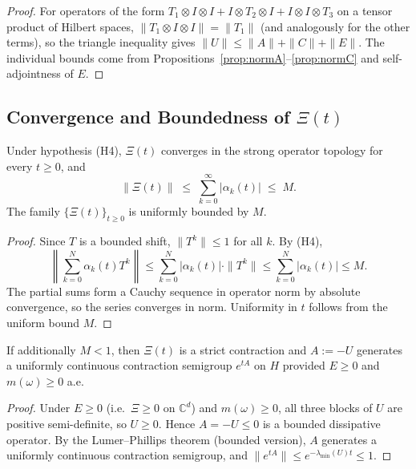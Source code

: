 \documentclass[11pt]{article}
\begin{document}
\begin{proof}
For operators of the form
$T_{1}\otimes I\otimes I + I\otimes T_{2}\otimes I + I\otimes I\otimes T_{3}$
on a tensor product of Hilbert spaces,
$\|T_{1}\otimes I\otimes I\|=\|T_{1}\|$ (and analogously for the other terms),
so the triangle inequality gives
$\|U\|\leq\|A\|+\|C\|+\|E\|$.
The individual bounds come from
Propositions~\ref{prop:normA}--\ref{prop:normC}
and self-adjointness of $E$.
\end{proof}

\subsection{Convergence and Boundedness of \texorpdfstring{$\Xi(t)$}{Xi(t)}}
\label{sec:Xi}

\begin{theorem}
\label{thm:Xiconv}
Under hypothesis \textup{(H4)},
$\Xi(t)$ converges in the strong operator topology
for every $t\geq 0$, and
\[
\|\Xi(t)\| \;\leq\; \sum_{k=0}^{\infty}|\alpha_{k}(t)| \;\leq\; M.
\]
The family $\{\Xi(t)\}_{t\geq 0}$ is uniformly bounded by $M$.
\end{theorem}

\begin{proof}
Since $T$ is a bounded shift, $\|T^{k}\|\leq 1$ for all $k$.
By (H4),
\[
\left\|\sum_{k=0}^{N}\alpha_{k}(t)T^{k}\right\|
\leq \sum_{k=0}^{N}|\alpha_{k}(t)|\cdot\|T^{k}\|
\leq \sum_{k=0}^{N}|\alpha_{k}(t)|
\leq M.
\]
The partial sums form a Cauchy sequence in operator norm
by absolute convergence, so the series converges in norm.
Uniformity in $t$ follows from the uniform bound $M$.
\end{proof}

\begin{corollary}
\label{cor:contract}
If additionally $M < 1$, then $\Xi(t)$ is a strict contraction
and $A:= -U$ generates a uniformly continuous contraction semigroup
$e^{tA}$ on $H$ provided $E\geq 0$ and $m(\omega)\geq 0$ a.e.
\end{corollary}

\begin{proof}
Under $E\geq 0$ (i.e.\ $\Xi\geq 0$ on $\mathbb{C}^{d}$) and
$m(\omega)\geq 0$, all three blocks of $U$ are positive
semi-definite, so $U\geq 0$.
Hence $A=-U\leq 0$ is a bounded dissipative operator.
By the Lumer--Phillips theorem (bounded version),
$A$ generates a uniformly continuous contraction semigroup,
and $\|e^{tA}\|\leq e^{-\lambda_{\min}(U)t}\leq 1$.
\end{proof}
\end{document}
